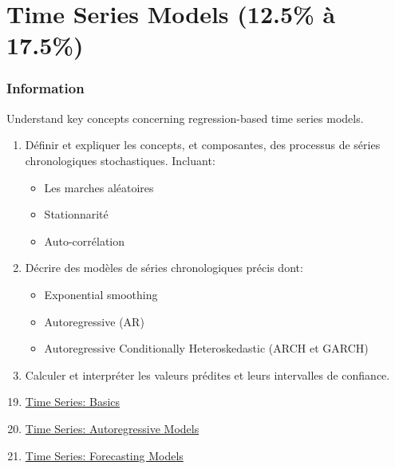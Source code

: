 \documentclass[12pt, titlepage, french]{report}
\begin{document}
\newpage

\chapter[Time Series Models]{Time Series Models (12.5\% à 17.5\%)}

\subsection{Information}

\begin{distributions}[Objective]
Understand key concepts concerning regression-based time series models.
\end{distributions}

\begin{outcomes}
\begin{enumerate}
	\item	Définir et expliquer les concepts, et composantes, des processus de séries chronologiques stochastiques. Incluant:
	\begin{itemize}
		\item	Les marches aléatoires
		\item	Stationnarité
		\item	Auto-corrélation
	\end{itemize}
	\item	Décrire des modèles de séries chronologiques précis dont:
	\begin{itemize}
		\item	Exponential smoothing
		\item	Autoregressive (AR)
		\item	Autoregressive Conditionally Heteroskedastic (ARCH et GARCH)
	\end{itemize}
	\item	Calculer et interpréter les valeurs prédites et leurs intervalles de confiance.
\end{enumerate}
\end{outcomes}

\begin{ASM_chapter}
\begin{enumerate}
  \setcounter{enumi}{18}
	\item	\hyperref[timeseries19]{Time Series: Basics}
	\item	\hyperref[timeseries20]{Time Series: Autoregressive Models}
	\item	\hyperref[timeseries21]{Time Series: Forecasting Models}
\end{enumerate}
\end{ASM_chapter}
\end{document}
